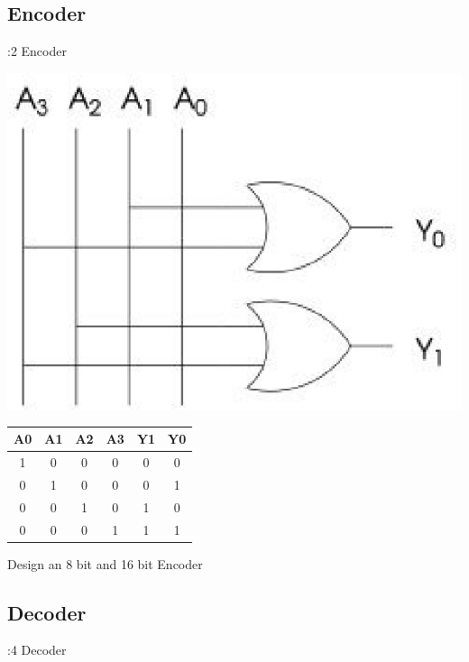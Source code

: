 \documentclass[journal,12pt,twocolumn]{IEEEtran}
\begin{document}
\subsection{Encoder}
:2 Encoder

\vspace{0.5cm}
\includegraphics[scale=0.7]{img/42enoder1a}
\begin{table}[h!]
\centering
\begin{tabular}{|cccc|cc|}
\hline
A0	&	A1	&	A2	&	A3	&	Y1	&	Y0 \\\hline
1	&	0	&	0	&	0	&	0	&	0 	\\\hline
0	&	1	&	0	&	0	&	0	&	1	\\\hline
0	&	0	&	1	&	0	&	1	&	0	\\\hline
0	&	0	&	0	&	1	&	1	&	1	\\\hline

\end{tabular}
\end{table}

\problem Design an 8 bit and 16 bit Encoder
\subsection{Decoder}
:4 Decoder 
\end{document}
